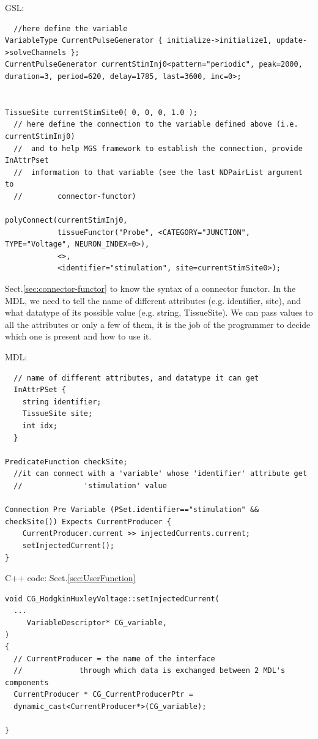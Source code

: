 GSL:
\begin{verbatim}
  //here define the variable
VariableType CurrentPulseGenerator { initialize->initialize1, update->solveChannels };
CurrentPulseGenerator currentStimInj0<pattern="periodic", peak=2000, duration=3, period=620, delay=1785, last=3600, inc=0>; 


TissueSite currentStimSite0( 0, 0, 0, 1.0 );
  // here define the connection to the variable defined above (i.e. currentStimInj0)
  //  and to help MGS framework to establish the connection, provide InAttrPset
  //  information to that variable (see the last NDPairList argument to
  //        connector-functor)
  
polyConnect(currentStimInj0, 
            tissueFunctor("Probe", <CATEGORY="JUNCTION", TYPE="Voltage", NEURON_INDEX=0>), 
            <>, 
            <identifier="stimulation", site=currentStimSite0>);
\end{verbatim}
Sect.\ref{sec:connector-functor} to know the syntax of a connector functor. In
the MDL, we need to tell the name of different attributes (e.g. identifier,
site), and what datatype of its possible value (e.g. string, TissueSite). We can
pass values to all the attributes or only a few of them, it is the job of the
programmer to decide which one is present and how to use it.

MDL:
\begin{verbatim}
  // name of different attributes, and datatype it can get
  InAttrPSet {
    string identifier;
    TissueSite site;
    int idx;
  }

PredicateFunction checkSite;
  //it can connect with a 'variable' whose 'identifier' attribute get
  //              'stimulation' value
  
Connection Pre Variable (PSet.identifier=="stimulation" && checkSite()) Expects CurrentProducer {
    CurrentProducer.current >> injectedCurrents.current;
    setInjectedCurrent();
}
\end{verbatim}

C++ code: Sect.\ref{sec:UserFunction}
\begin{lstlisting}
void CG_HodgkinHuxleyVoltage::setInjectedCurrent(
  ...
     VariableDescriptor* CG_variable, 
)
{
  // CurrentProducer = the name of the interface
  //             through which data is exchanged between 2 MDL's components
  CurrentProducer * CG_CurrentProducerPtr =
  dynamic_cast<CurrentProducer*>(CG_variable);
  
}
\end{lstlisting}


